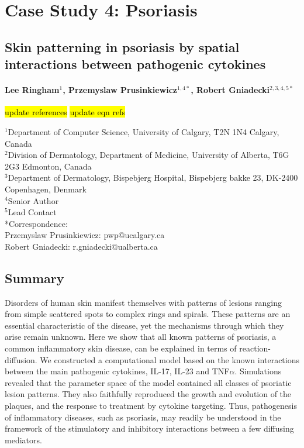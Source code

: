 \chapter{Case Study 4: Psoriasis}
\section*{Skin patterning in psoriasis by spatial interactions between pathogenic cytokines}
\subsubsection*{Lee Ringham$^1$, Przemyslaw Prusinkiewicz$^{1,4*}$, Robert Gniadecki$^{2,3,4,5*}$}

\hl{update references}
\hl{update eqn refs}


$^1$Department of Computer Science, University of Calgary, T2N 1N4 Calgary, Canada\\
$^2$Division of Dermatology, Department of Medicine, University of Alberta, T6G 2G3 Edmonton, Canada\\
$^3$Department of Dermatology, Bispebjerg Hospital, Bispebjerg bakke 23, DK-2400 Copenhagen, Denmark\\
$^4$Senior Author\\
$^5$Lead Contact\\
*Correspondence:\\
Przemyslaw Prusinkiewicz: pwp@ucalgary.ca\\
Robert Gniadecki: r.gniadecki@ualberta.ca\\

\section{Summary} 
Disorders of human skin manifest themselves with patterns of lesions ranging from simple scattered spots to complex rings and spirals. These patterns are an essential characteristic of the disease, yet the mechanisms through which they arise remain unknown. Here we show that all known patterns of psoriasis, a common inflammatory skin disease, can be explained in terms of reaction-diffusion. We constructed a computational model based on the known interactions between the main pathogenic cytokines, IL-17, IL-23 and TNF$\alpha$. Simulations revealed that the parameter space of the model contained all classes of psoriatic lesion patterns. They also faithfully reproduced the growth and evolution of the plaques, and the response to treatment by cytokine targeting. Thus, pathogenesis of inflammatory diseases, such as psoriasis, may readily be understood in the framework of the stimulatory and inhibitory interactions between a few diffusing mediators.

